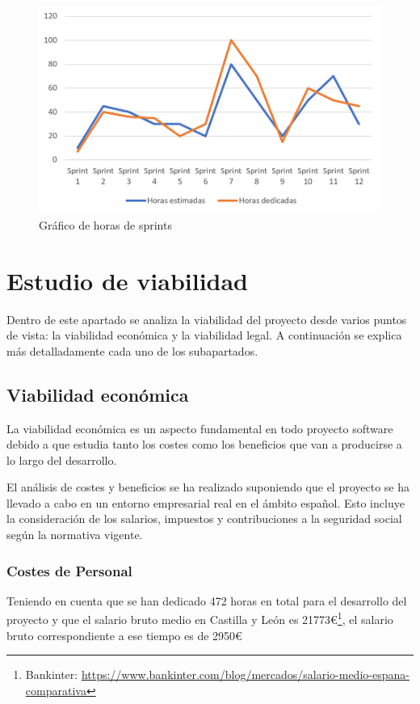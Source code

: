 \begin{figure}[h]
    \centering
    \includegraphics[width=1\linewidth]{Imagenes/GraficoSprint.png}
    \caption{Gráfico de horas de sprints}
    \label{Gráfico de horas de sprints}
\end{figure}
\FloatBarrier

\section{Estudio de viabilidad}
Dentro de este apartado se analiza la viabilidad del proyecto desde varios puntos de vista: la viabilidad económica y la viabilidad legal. A continuación se explica más detalladamente cada uno de los subapartados.

\subsection{Viabilidad económica}
La viabilidad económica es un aspecto fundamental en todo proyecto software debido a que estudia tanto los costes como los beneficios que van a producirse a lo largo del desarrollo.

El análisis de costes y beneficios se ha realizado suponiendo que el proyecto se ha llevado a cabo en un entorno empresarial real en el ámbito español. Esto incluye la consideración de los salarios, impuestos y contribuciones a la seguridad social según la normativa vigente.

\subsubsection*{Costes de Personal}
Teniendo en cuenta que se han dedicado 472 horas en total para el desarrollo del proyecto y que el salario bruto medio en Castilla y León es 21773€\footnote{Bankinter: \url{https://www.bankinter.com/blog/mercados/salario-medio-espana-comparativa}}, el salario bruto correspondiente a ese tiempo es de 2950€


